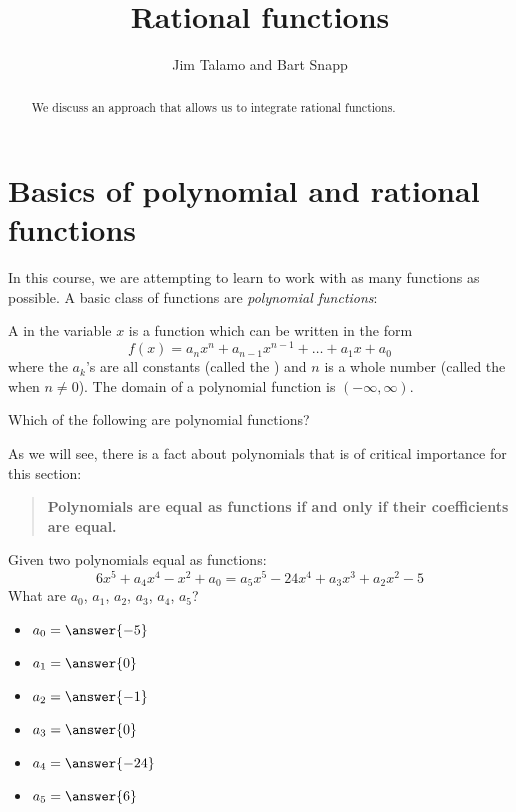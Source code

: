 \documentclass{ximera}
\author{Jim Talamo and Bart Snapp}
\title[Dig-In:]{Rational functions}
\begin{document}
\begin{abstract}
We discuss an approach that allows us to integrate rational functions.
\end{abstract}
\maketitle

\section{Basics of polynomial and rational functions}

In this course, we are attempting to learn to work with as many
functions as possible. A basic class of functions are \textit{polynomial functions}:

\begin{definition}
  A  in the variable $x$ is a function
  which can be written in the form
  \[
  f(x) = a_nx^n + a_{n-1}x^{n-1} + \dots + a_1 x + a_0
  \]
  where the $a_k$'s are all constants (called the )
  and $n$ is a whole number (called the  when $n\ne
  0$). The domain of a polynomial function is $(-\infty,\infty)$.
\end{definition}

\begin{question}
  Which of the following are polynomial functions?
  \begin{selectAll}
  \end{selectAll}
\end{question}

As we will see, there is a fact about polynomials that is of critical
importance for this section:
\begin{quote}
  \textbf{Polynomials are equal as functions if and only if their
    coefficients are equal.}
\end{quote}

\begin{question}
  Given two polynomials equal as functions:
  \[
  6x^5+a_4 x^4 -x^2 + a_0 = a_5 x^5 - 24 x^4 + a_3 x^3 + a_2 x^2 - 5
  \]
  What are $a_0$, $a_1$, $a_2$, $a_3$, $a_4$, $a_5$?
  \begin{prompt}
    \begin{itemize}
    \item $a_0 = \answer{-5}$
    \item $a_1 = \answer{0}$
    \item $a_2 = \answer{-1}$
    \item $a_3 = \answer{0}$
    \item $a_4 = \answer{-24}$
    \item $a_5 = \answer{6}$
    \end{itemize}
  \end{prompt}
\end{question}
\end{document}
